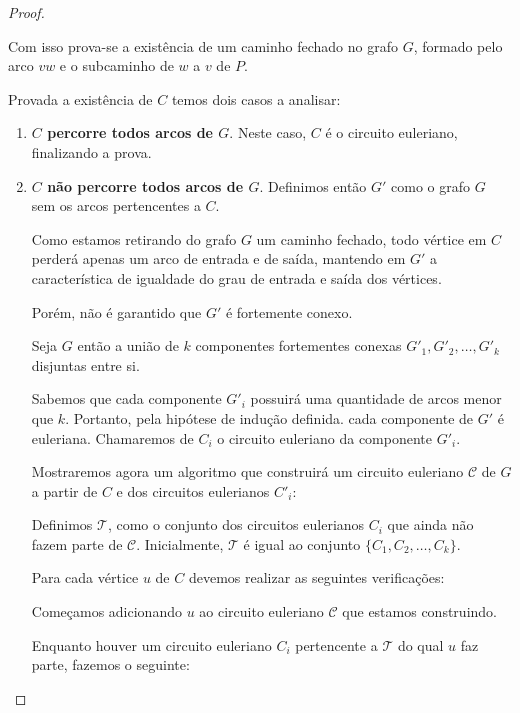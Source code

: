 \documentclass[12pt, a4paper]{article}
\begin{document}
\begin{proof}
\begin{tcolorbox}
        Com isso prova-se a existência de um caminho fechado no grafo $G$, formado pelo arco $vw$ e o subcaminho de $w$ a $v$ de $P$.
    \end{tcolorbox}

    Provada a existência de $C$ temos dois casos a analisar:

    \begin{enumerate}
        \item \textbf{$C$ percorre todos arcos de $G$}.
            Neste caso, $C$ é o circuito euleriano, finalizando a prova.

        \item \textbf{$C$ não percorre todos arcos de $G$}.
            Definimos então $G'$ como o grafo $G$ sem os arcos pertencentes a $C$.

            Como estamos retirando do grafo $G$ um caminho fechado, todo vértice em $C$ perderá apenas um arco de entrada e de saída, mantendo em $G'$ a característica de igualdade do grau de entrada e saída dos vértices.

            Porém, não é garantido que $G'$ é fortemente conexo. 

            \sloppy Seja $G$ então a união de $k$ componentes fortementes conexas $G'_1, G'_2, \dots, G'_k$ disjuntas entre si.

            Sabemos que cada componente $G'_i$ possuirá uma quantidade de arcos menor que $k$. 
            Portanto, pela hipótese de indução definida. cada componente de $G'$ é euleriana.
            Chamaremos de $C_i$ o circuito euleriano da componente $G'_i$.

            Mostraremos agora um algoritmo que construirá um circuito euleriano $\mathcal{C}$ de $G$ a partir de $C$ e dos circuitos eulerianos $C'_i$:


            Definimos $\mathcal{T}$, como o conjunto dos circuitos eulerianos $C_i$ que ainda não fazem parte de $\mathcal{C}$. 
            Inicialmente, $\mathcal{T}$ é igual ao conjunto $\{C_1, C_2, \dots, C_k\}$.


            Para cada vértice $u$ de $C$ devemos realizar as seguintes verificações:

            \begin{tcolorbox}

                Começamos adicionando $u$ ao circuito euleriano $\mathcal{C}$ que estamos construindo.

                Enquanto houver um circuito euleriano $C_i$ pertencente a $\mathcal{T}$ do qual $u$ faz parte, fazemos o seguinte:



\end{tcolorbox}
\end{enumerate}
\end{proof}
\end{document}
